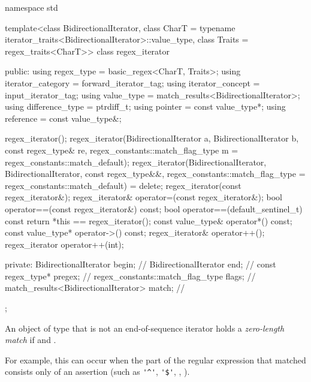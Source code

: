 \begin{codeblock}
namespace std {
  template<class BidirectionalIterator,
           class CharT = typename iterator_traits<BidirectionalIterator>::value_type,
           class Traits = regex_traits<CharT>>
    class regex_iterator {
    public:
      using regex_type        = basic_regex<CharT, Traits>;
      using iterator_category = forward_iterator_tag;
      using iterator_concept  = input_iterator_tag;
      using value_type        = match_results<BidirectionalIterator>;
      using difference_type   = ptrdiff_t;
      using pointer           = const value_type*;
      using reference         = const value_type&;

      regex_iterator();
      regex_iterator(BidirectionalIterator a, BidirectionalIterator b,
                     const regex_type& re,
                     regex_constants::match_flag_type m = regex_constants::match_default);
      regex_iterator(BidirectionalIterator, BidirectionalIterator,
                     const regex_type&&,
                     regex_constants::match_flag_type = regex_constants::match_default) = delete;
      regex_iterator(const regex_iterator&);
      regex_iterator& operator=(const regex_iterator&);
      bool operator==(const regex_iterator&) const;
      bool operator==(default_sentinel_t) const { return *this == regex_iterator(); }
      const value_type& operator*() const;
      const value_type* operator->() const;
      regex_iterator& operator++();
      regex_iterator operator++(int);

    private:
      BidirectionalIterator                begin;               // \expos
      BidirectionalIterator                end;                 // \expos
      const regex_type*                    pregex;              // \expos
      regex_constants::match_flag_type     flags;               // \expos
      match_results<BidirectionalIterator> match;               // \expos
    };
}
\end{codeblock}

\pnum
An object of type  that is not an end-of-sequence iterator
holds a \textit{zero-length match} if  and
.
\begin{note}
For
example, this can occur when the part of the regular expression that
matched consists only of an assertion (such as \verb|'^'|, \verb|'$'|,
, ).
\end{note}

